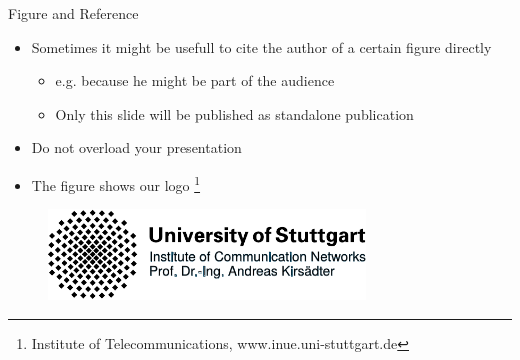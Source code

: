 \documentclass[english,american,german,aspectratio=43]{beamer}
\begin{document}
\begin{frame}{Figure and Reference }

  \begin{itemize}
    \item Sometimes it might be usefull to cite the author of a certain figure
      directly

      \begin{itemize}
        \item e.g. because he might be part of the audience
        \item Only this slide will be published as standalone publication
      \end{itemize}
    \item Do not overload your presentation
    \item The figure shows our logo \footnote{Institute of
      Telecommunications, www.inue.uni-stuttgart.de}
  \end{itemize}
  \begin{figure}
    \centering{}\includegraphics[width=0.75\textwidth]{img/logo_vector_example}
  \end{figure}

\end{frame}
\end{document}
